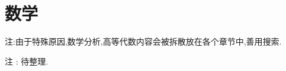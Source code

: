 \part{数学}{

  注:由于特殊原因,数学分析,高等代数内容会被拆散放在各个章节中,善用搜索.

  注 : 待整理.

  
   
   
   
   
   
   
   
   

}%
